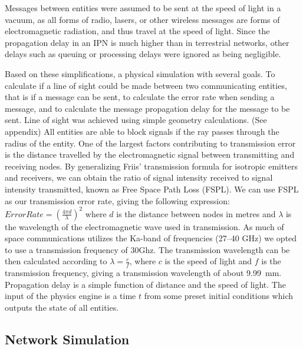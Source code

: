 \documentclass[a4paper,12pt]{article}
\begin{document}
Messages between entities were assumed to be sent at the speed of light in a vacuum, as all
forms of radio, lasers, or other wireless messages are forms of electromagnetic radiation,
and thus travel at the speed of
light. Since the propagation delay in an IPN is much higher than in terrestrial networks, other
delays such as queuing or processing delays were ignored as being negligible.

Based on these simplifications, a physical simulation with several goals. To
calculate if a line of sight could be made between two communicating entities,
that is if a message can be sent, to calculate the error rate when sending a
message, and to calculate the message propagation delay for the message to be
sent. Line of sight was achieved using simple geometry calculations. (See
appendix) All entities are able to block signals if the ray passes through the
radius of the entity. One of the largest factors contributing to transmission
error is the distance travelled by the electromagnetic signal between
transmitting and receiving nodes. By generalizing Friis' transmission formula\cite{Friis}
for isotropic emitters and receivers, we can obtain the ratio of signal
intensity received to signal intensity transmitted, known as Free Space Path
Loss (FSPL). We can use FSPL as our transmission error rate, giving the
following expression: $Error Rate = {(\frac{4 \pi d}{\lambda})}^2$ where $d$ is
the distance between nodes in metres and $\lambda$ is the wavelength of the
electromagnetic wave used in transmission. As much of space communications
utilizes the Ka-band of frequencies (27--40 GHz)\cite{Morabito_Hastrup} we opted to use a transmission
frequency of 30Ghz. The transmission wavelength can be then calculated according
to $\lambda = \frac{c}{f}$, where $c$ is the speed of light and $f$ is the
transmission frequency, giving a transmission wavelength of about 9.99~mm.
Propagation delay is a simple function of distance and the speed of light. The
input of the physics engine is a time $t$ from some preset initial conditions
which outputs the state of all entities.

\subsection{Network Simulation}
\end{document}
